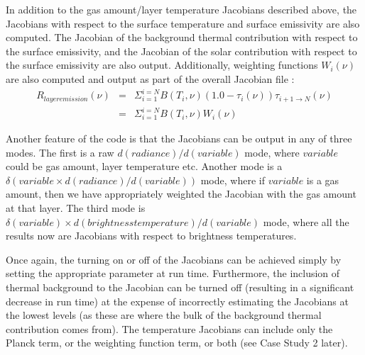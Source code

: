 \documentclass[11pt]{article}
\begin{document}
In addition to the gas amount/layer temperature Jacobians described
above, the Jacobians with respect to the surface temperature and
surface emissivity are also computed. The Jacobian of the background
thermal contribution with respect to the surface emissivity, and the
Jacobian of the solar contribution with respect to the surface
emissivity are also output.  Additionally, weighting functions
$W_{i}(\nu)$ are also computed and output as part of the overall
Jacobian file :
\begin{eqnarray*}
R_{layer emission} (\nu) &  = &
\Sigma_{i=1}^{i=N} B(T_{i},\nu) (1.0 - \tau_{i}(\nu)) 
\tau_{i+1\rightarrow N}(\nu) \\
& = &\Sigma_{i=1}^{i=N} B(T_{i},\nu) W_{i}(\nu)
\end{eqnarray*}

Another feature of the code is that the Jacobians can be output in any
of three modes. The first is a raw $d(radiance)/d(variable)$ mode,
where $variable$ could be gas amount, layer temperature etc. Another
mode is a $\delta(variable \times d(radiance)/d(variable))$ mode, where if
$variable$ is a gas amount, then we have appropriately weighted the
Jacobian with the gas amount at that layer. The third mode is 
$\delta(variable) \times d(brightness temperature)/d(variable)$ mode, where
all the results now are Jacobians with respect to brightness
temperatures.

Once again, the turning on or off of the Jacobians can be achieved
simply by setting the appropriate parameter at run time. Furthermore,
the inclusion of thermal background to the Jacobian can be turned off
(resulting in a significant decrease in run time) at the expense of
incorrectly estimating the Jacobians at the lowest levels (as these
are where the bulk of the background thermal contribution comes from).
The temperature Jacobians can include only the Planck term, or the weighting
function term, or both (see Case Study 2 later). 
\end{document}
